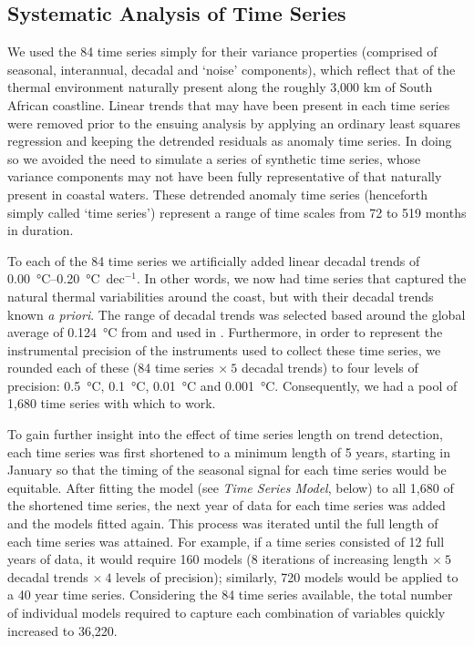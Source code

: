 \documentclass[]{ametsoc}
\begin{document}
\subsection{Systematic Analysis of Time Series}
We used the 84 time series simply for their variance properties (comprised of seasonal, interannual, decadal and ‘noise’ components), which reflect that of the thermal environment naturally present along the roughly 3,000 km of South African coastline. Linear trends that may have been present in each time series were removed prior to the ensuing analysis by applying an ordinary least squares regression and keeping the detrended residuals as anomaly time series. In doing so we avoided the need to simulate a series of synthetic time series, whose variance components may not have been fully representative of that naturally present in coastal waters. These detrended anomaly time series (henceforth simply called `time series') represent a range of time scales from 72 to 519 months in duration.

To each of the 84 time series we artificially added linear decadal trends of \SIrange{0.00}{0.20}{\degreeCelsius}~dec$^{-1}$. In other words, we now had time series that captured the natural thermal variabilities around the coast, but with their decadal trends known \emph{a priori}. The range of decadal trends was selected based around the global average of \SI{0.124}{\degreeCelsius} from \citet{Kennedy2011} and used in \citet{IPCC2013}. Furthermore, in order to represent the instrumental precision of the instruments used to collect these time series, we rounded each of these (84 time series $\times~5$ decadal trends) to four levels of precision: \SI{0.5}{\degreeCelsius}, \SI{0.1}{\degreeCelsius}, \SI{0.01}{\degreeCelsius} and \SI{0.001}{\degreeCelsius}. Consequently, we had a pool of 1,680 time series with which to work.

To gain further insight into the effect of time series length on trend detection, each time series was first shortened to a minimum length of 5 years, starting in January so that the timing of the seasonal signal for each time series would be equitable. After fitting the model (see \emph{Time Series Model}, below) to all 1,680 of the shortened time series, the next year of data for each time series was added and the models fitted again. This process was iterated until the full length of each time series was attained. For example, if a time series consisted of 12 full years of data, it would require 160 models (8 iterations of increasing length $\times~5$ decadal trends $\times~4$ levels of precision); similarly, 720 models would be applied to a 40 year time series. Considering the 84 time series available, the total number of individual models required to capture each combination of variables quickly increased to 36,220.
\end{document}
